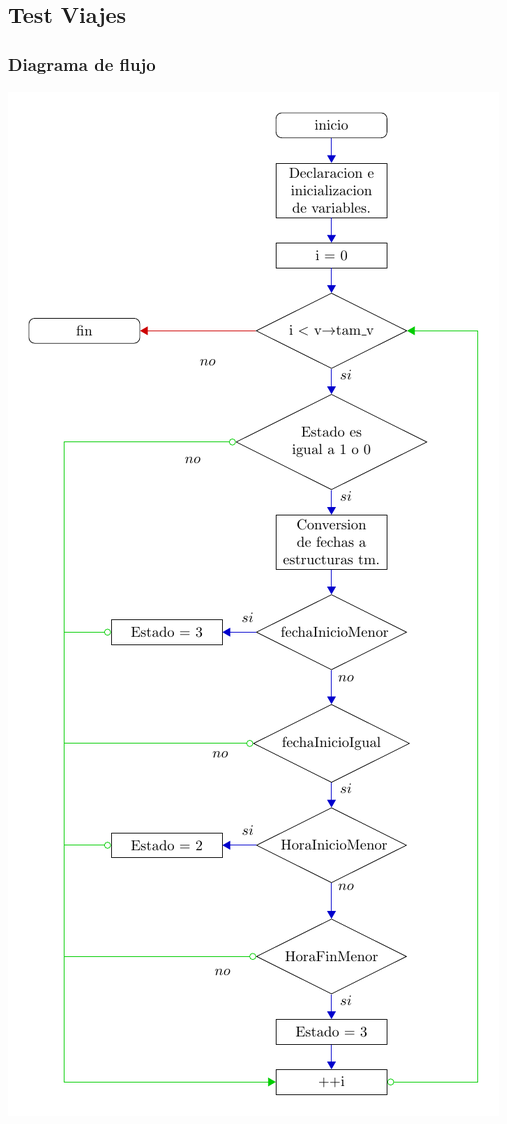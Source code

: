 \subsection{Test Viajes}
\subsubsection{Diagrama de flujo}
\includegraphics[width=\textwidth, angle=0,scale=0.75]{dep/flujoupviajes.pdf}
